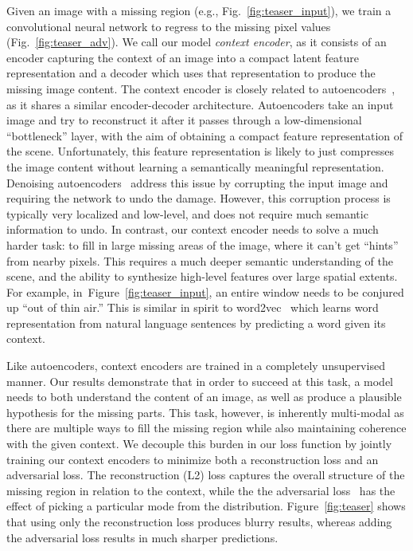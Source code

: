 \documentclass[10pt,twocolumn,letterpaper]{article}
\newcommand{\reffig}[1]{Figure~\ref{fig:#1}}
\newcommand{\shortreffig}[1]{Fig.~\ref{fig:#1}}
\begin{document}
%
Given an image with a missing region (e.g., \shortreffig{teaser_input}), we train a convolutional neural network to regress to the missing pixel values (\shortreffig{teaser_adv}).
We call our model \textit{context encoder}, as it consists of an encoder capturing the context of an image into a compact latent feature representation and a decoder which uses that representation to produce the missing image content.
%
The context encoder is closely related to autoencoders~\cite{hintonautoenc,bengio2009learning}, as it shares a similar encoder-decoder architecture.
Autoencoders take an input image and try to reconstruct it after it passes through a low-dimensional ``bottleneck'' layer, with the aim of obtaining a compact feature representation of the scene.
Unfortunately, this feature representation is likely to just compresses the image content without learning a semantically meaningful representation.
Denoising autoencoders~\cite{denoising} address this issue by corrupting the input image and requiring the network to undo the damage.
However, this corruption process is typically very localized and low-level, and does not require much semantic information to undo.
In contrast, our context encoder needs to solve a much harder task: to fill in large missing areas of the image, where it can't get ``hints'' from nearby pixels.
This requires a much deeper semantic understanding of the scene, and the ability to synthesize high-level features over large spatial extents.
For example, in~\reffig{teaser_input}, an entire window needs to be conjured up ``out of thin air.''  This is similar in spirit to word2vec~\cite{mikolov2013distributed} which learns word representation from natural language sentences by predicting a word given its context.
%

Like autoencoders, context encoders are trained in a completely unsupervised manner.
Our results demonstrate that in order to succeed at this task, a model needs to both understand the content of an image, as well as produce a plausible hypothesis for the missing parts.
This task, however, is inherently multi-modal as there are multiple ways to fill the missing region while also maintaining coherence with the given context.
We decouple this burden in our loss function by jointly training our context encoders to minimize both a reconstruction loss and an adversarial loss.
The reconstruction (L2) loss captures the overall structure of the missing region in relation to the context, while the the adversarial loss~\cite{goodfellow2014generative}
has the effect of picking a particular mode from the distribution.  \reffig{teaser} shows that using only the reconstruction loss produces blurry results, whereas adding the adversarial loss results in much sharper predictions.
%
\end{document}
